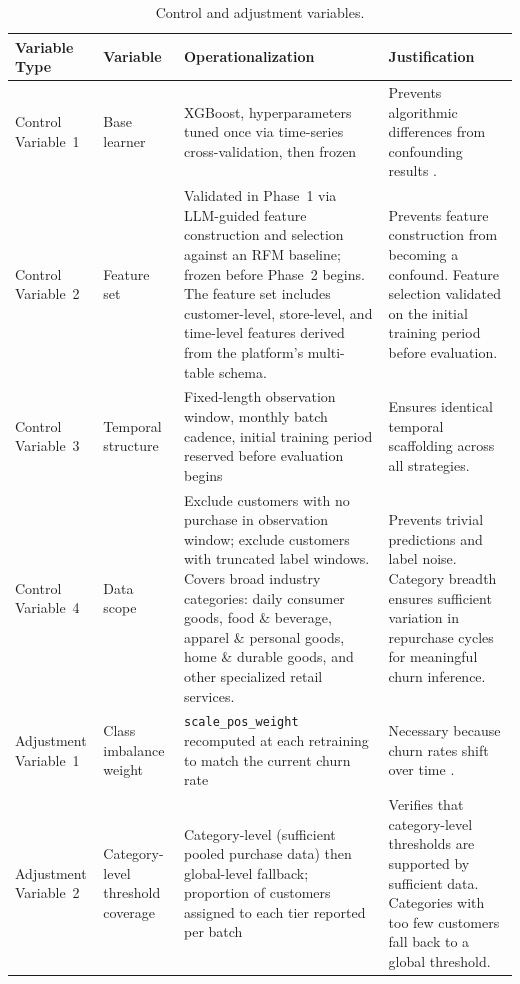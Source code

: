 \begin{table}[htbp]
  \centering
  \begin{threeparttable}[c]
    \caption{Control and adjustment variables.}
    \label{tab:design-variables}
    \footnotesize
    \begin{tabular}{>{\raggedright\arraybackslash}p{2.1cm} >{\raggedright\arraybackslash}p{1.9cm} >{\raggedright\arraybackslash}p{4.6cm} >{\raggedright\arraybackslash}p{4.6cm}}
      \toprule
      Variable Type & Variable & Operationalization & Justification \\
      \midrule
      Control Variable~1 & Base learner &
        XGBoost, hyperparameters tuned once via time-series cross-validation, then frozen &
        Prevents algorithmic differences from confounding results \cite{chen2016}. \\[6pt]
      Control Variable~2 & Feature set &
        Validated in Phase~1 via LLM-guided feature construction and selection against an RFM baseline; frozen before Phase~2 begins. The feature set includes customer-level, store-level, and time-level features derived from the platform's multi-table schema. &
        Prevents feature construction from becoming a confound. Feature selection validated on the initial training period before evaluation. \\[6pt]
      Control Variable~3 & Temporal structure &
        Fixed-length observation window, monthly batch cadence, initial training period reserved before evaluation begins &
        Ensures identical temporal scaffolding across all strategies. \\[6pt]
      Control Variable~4 & Data scope &
        Exclude customers with no purchase in observation window; exclude customers with truncated label windows. Covers broad industry categories: daily consumer goods, food \& beverage, apparel \& personal goods, home \& durable goods, and other specialized retail services. &
        Prevents trivial predictions and label noise. Category breadth ensures sufficient variation in repurchase cycles for meaningful churn inference. \\
      \midrule
      Adjustment Variable~1 & Class imbalance weight &
        \texttt{scale\_pos\_weight} recomputed at each retraining to match the current churn rate &
        Necessary because churn rates shift over time \cite{he2009}. \\[6pt]
      Adjustment Variable~2 & Category-level threshold coverage &
        Category-level (sufficient pooled purchase data) then global-level fallback; proportion of customers assigned to each tier reported per batch &
        Verifies that category-level thresholds are supported by sufficient data. Categories with too few customers fall back to a global threshold. \\
      \bottomrule
    \end{tabular}
  \end{threeparttable}
\end{table}

